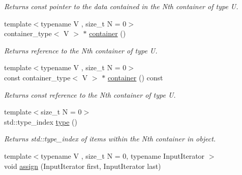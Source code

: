 \begin{DoxyCompactItemize}
\begin{DoxyCompactList}\small\item\em Returns const pointer to the data contained in the Nth container of type U. \end{DoxyCompactList}\item 
\hypertarget{classheterogeneous_1_1heterovector_3_01_t_00_01_u_00_01_types_8_8_8_4_afe3b7f95acac49db2eaebf519220d2cf}{}{\footnotesize template$<$typename V , size\+\_\+t N = 0$>$ }\\container\+\_\+type$<$ V $>$ $\ast$ \hyperlink{classheterogeneous_1_1heterovector_3_01_t_00_01_u_00_01_types_8_8_8_4_afe3b7f95acac49db2eaebf519220d2cf}{container} ()\label{classheterogeneous_1_1heterovector_3_01_t_00_01_u_00_01_types_8_8_8_4_afe3b7f95acac49db2eaebf519220d2cf}

\begin{DoxyCompactList}\small\item\em Returns reference to the Nth container of type U. \end{DoxyCompactList}\item 
\hypertarget{classheterogeneous_1_1heterovector_3_01_t_00_01_u_00_01_types_8_8_8_4_a4c3ea33512eb2f185cfc2af350395d39}{}{\footnotesize template$<$typename V , size\+\_\+t N = 0$>$ }\\const container\+\_\+type$<$ V $>$ $\ast$ \hyperlink{classheterogeneous_1_1heterovector_3_01_t_00_01_u_00_01_types_8_8_8_4_a4c3ea33512eb2f185cfc2af350395d39}{container} () const \label{classheterogeneous_1_1heterovector_3_01_t_00_01_u_00_01_types_8_8_8_4_a4c3ea33512eb2f185cfc2af350395d39}

\begin{DoxyCompactList}\small\item\em Returns const reference to the Nth container of type U. \end{DoxyCompactList}\item 
\hypertarget{classheterogeneous_1_1heterovector_3_01_t_00_01_u_00_01_types_8_8_8_4_a4bc9c887070b80c06552121611d336f9}{}{\footnotesize template$<$size\+\_\+t N = 0$>$ }\\std\+::type\+\_\+index \hyperlink{classheterogeneous_1_1heterovector_3_01_t_00_01_u_00_01_types_8_8_8_4_a4bc9c887070b80c06552121611d336f9}{type} ()\label{classheterogeneous_1_1heterovector_3_01_t_00_01_u_00_01_types_8_8_8_4_a4bc9c887070b80c06552121611d336f9}

\begin{DoxyCompactList}\small\item\em Returns std\+::type\+\_\+index of items within the Nth container in object. \end{DoxyCompactList}\item 
\hypertarget{classheterogeneous_1_1heterovector_3_01_t_00_01_u_00_01_types_8_8_8_4_aa7831c9840406feb421bf2e3676d7704}{}{\footnotesize template$<$typename V , size\+\_\+t N = 0, typename Input\+Iterator $>$ }\\void \hyperlink{classheterogeneous_1_1heterovector_3_01_t_00_01_u_00_01_types_8_8_8_4_aa7831c9840406feb421bf2e3676d7704}{assign} (Input\+Iterator first, Input\+Iterator last)\label{classheterogeneous_1_1heterovector_3_01_t_00_01_u_00_01_types_8_8_8_4_aa7831c9840406feb421bf2e3676d7704}


\end{DoxyCompactItemize}
